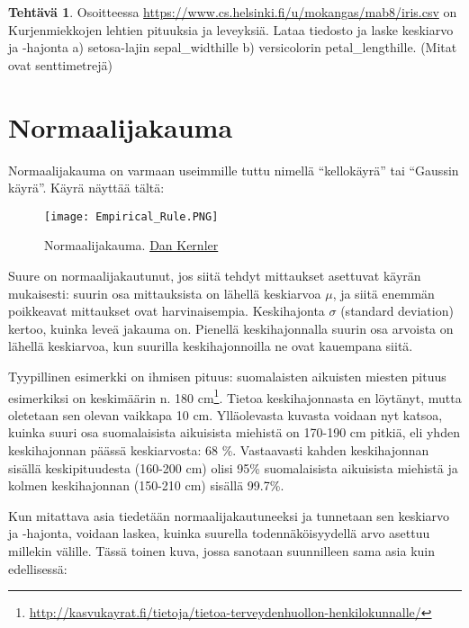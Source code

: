 \documentclass[12pt,leqno,a4paper,oneside]{amsart}
\theoremstyle{definition}
\newtheorem{exercise}{Tehtävä}
\theoremstyle{remark}
\numberwithin{equation}{section}
\begin{document}
\begin{exercise}
 Osoitteessa \url{https://www.cs.helsinki.fi/u/mokangas/mab8/iris.csv} on Kurjenmiekkojen lehtien pituuksia ja leveyksiä.
 Lataa tiedosto ja laske keskiarvo ja -hajonta a) setosa-lajin sepal\_widthille b) versicolorin petal\_lengthille. (Mitat ovat senttimetrejä)
\end{exercise}


\newpage
\section{Normaalijakauma}

Normaalijakauma on varmaan useimmille tuttu nimellä ``kellokäyrä'' tai ``Gaussin käyrä''. Käyrä näyttää tältä:

\begin{figure}[H]
\begin{center}
\texttt{[image: Empirical\_Rule.PNG]}
\caption{Normaalijakauma. \textcopyright \href{https://en.wikipedia.org/wiki/File:Empirical_Rule.PNG}{Dan Kernler}}
\label{normaalijakauma}
\end{center}
\end{figure}


Suure on normaalijakautunut, jos siitä tehdyt mittaukset asettuvat käyrän mukaisesti: suurin osa mittauksista on lähellä keskiarvoa $\mu$, ja siitä enemmän
poikkeavat mittaukset ovat harvinaisempia. Keski\-hajonta $\sigma$ (standard deviation) kertoo, kuinka leveä jakauma on. Pienel\-lä 
keskihajonnalla suurin osa arvoista on lähellä
keskiarvoa, kun suurilla keskihajonnoilla ne ovat kauempana siitä.

Tyypillinen esimerkki on ihmisen pituus: suomalaisten aikuisten mies\-ten pituus esimerkiksi on keskimäärin
n. 180 cm\footnote{\url{http://kasvukayrat.fi/tietoja/tietoa-terveydenhuollon-henkilokunnalle/}}. Tietoa keski\-hajonnasta
en löytänyt, mutta oletetaan sen olevan vaikkapa 10 cm. Ylläolevasta kuvasta voidaan nyt katsoa, kuinka suuri osa suomalaisista 
aikuisista miehistä on 170-190 cm pitkiä, eli yhden keskihajonnan päässä keskiarvosta: 68 \%. Vastaavasti kahden keskihajonnan sisällä keskipituudesta
(160-200 cm) olisi 95\% suomalaisista aikuisista miehistä ja kolmen keskihajonnan (150-210 cm) sisällä 99.7\%.

Kun mitattava asia tiedetään normaalijakautuneeksi ja 
tunnetaan sen keskiarvo ja -hajonta, voidaan laskea, kuinka suurella todennäköisyydellä arvo asettuu millekin välille. Tässä toinen kuva, jossa sanotaan
suunnilleen sama asia kuin edellisessä:
\end{document}
